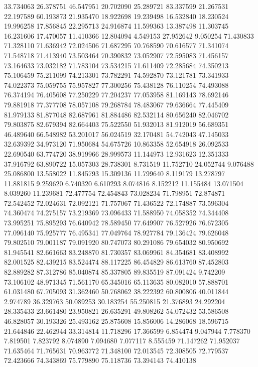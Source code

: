 33.734063
26.378751
46.547951
20.702090
25.289721
83.337599
21.267531
22.197589
60.193873
21.935470
18.922698
19.239498
16.532840
18.230524
19.996258
17.856845
22.295713
24.916874
11.599363
13.387498
11.303745
16.231606
17.470057
11.410366
12.804094
4.549153
27.952642
9.050254
71.430833
71.328110
71.636942
72.024506
71.687295
70.768590
70.616577
71.341074
71.548718
71.413940
73.503464
70.390832
73.052907
72.595083
71.456157
73.164633
73.032182
71.783104
73.534215
71.611409
72.285684
74.350213
75.106459
75.211099
74.213301
73.782291
74.592870
73.121781
73.341933
74.022373
75.059755
75.957827
77.300256
75.438128
76.110254
74.493088
76.374194
76.405608
77.250229
77.204237
77.053958
81.169143
78.692146
79.881918
77.377708
78.057108
79.268784
78.483067
79.636664
77.445409
81.979133
81.877048
82.687961
81.884486
82.532114
80.656240
82.046702
79.803875
82.679394
82.664403
75.522550
51.932013
81.912019
56.689351
46.489640
66.548982
53.201017
56.024519
32.170481
54.742043
47.145033
32.639392
34.973120
71.950684
54.675726
10.863358
52.654918
26.092533
22.690540
63.774720
38.919966
28.999573
11.144973
12.931623
12.351333
37.916792
63.890722
15.057303
28.738301
8.731519
11.752710
24.052744
9.076488
25.086800
13.558022
11.845793
15.309136
11.799640
8.119179
13.278797
11.881815
9.259620
6.740320
6.610293
8.074816
8.152212
11.155484
13.071504
8.039260
11.239681
72.477754
72.454843
73.028234
71.798951
72.874871
72.542452
72.024631
72.092121
71.757067
71.436522
72.174887
73.596304
74.360474
74.275157
73.219369
73.096433
71.588950
74.058352
74.344408
73.995251
75.895293
76.640942
78.589450
77.649907
76.527926
76.672305
77.096140
75.925777
76.495341
77.049764
78.927784
79.136424
79.626048
79.802510
79.001187
79.091920
80.747073
80.291086
79.654032
80.950692
81.945541
82.661663
83.248870
81.730357
83.069961
84.354681
83.408992
82.001525
82.439215
83.524474
88.117225
86.454829
86.613760
87.452803
82.889282
87.312786
85.040874
85.337805
89.835519
87.091424
9.742209
73.106102
48.971345
71.561170
65.345016
65.113635
80.082010
57.888701
61.031480
67.705093
31.362460
50.768062
38.222392
60.800806
40.011844
2.974789
36.329763
50.089253
30.183254
55.250815
21.376893
24.292204
28.335433
23.661480
23.950821
26.635291
49.808262
54.072432
53.586508
46.828057
30.193326
25.493162
25.875608
15.856006
14.286068
18.596715
21.644846
22.462944
33.314814
11.718296
17.366599
6.854474
9.047944
7.778370
7.819501
7.823792
8.074890
7.094680
7.077117
8.555459
71.147262
71.952037
71.635464
71.765631
70.963772
71.348100
72.013545
72.308505
72.779537
72.423666
74.343869
75.779890
75.118736
73.394143
74.410138

